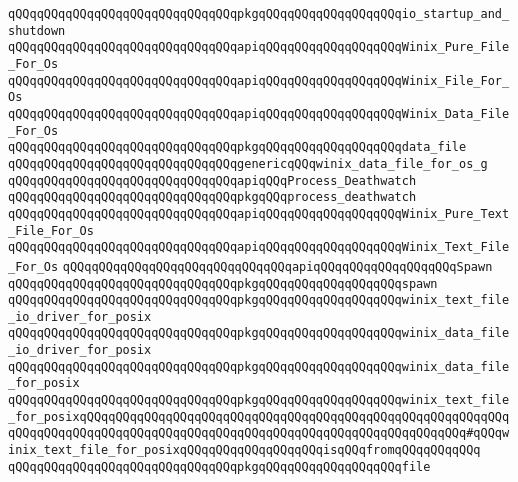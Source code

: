 \verb|qQQqqQQqqQQqqQQqqQQqqQQqqQQqqQQqpkgqQQqqQQqqQQqqQQqqQQqio_startup_and_shutdown|\newline
\newline
\verb|qQQqqQQqqQQqqQQqqQQqqQQqqQQqqQQqapiqQQqqQQqqQQqqQQqqQQqWinix_Pure_File_For_Os|\newline
\verb|qQQqqQQqqQQqqQQqqQQqqQQqqQQqqQQqapiqQQqqQQqqQQqqQQqqQQqWinix_File_For_Os|\newline
\verb|qQQqqQQqqQQqqQQqqQQqqQQqqQQqqQQqapiqQQqqQQqqQQqqQQqqQQqWinix_Data_File_For_Os|\newline
\verb|qQQqqQQqqQQqqQQqqQQqqQQqqQQqqQQqpkgqQQqqQQqqQQqqQQqqQQqdata_file|\newline
\verb|qQQqqQQqqQQqqQQqqQQqqQQqqQQqqQQqgenericqQQqwinix_data_file_for_os_g|\newline
\newline
\verb|qQQqqQQqqQQqqQQqqQQqqQQqqQQqqQQqapiqQQqProcess_Deathwatch|\newline
\verb|qQQqqQQqqQQqqQQqqQQqqQQqqQQqqQQqpkgqQQqprocess_deathwatch|\newline
\newline
\verb|qQQqqQQqqQQqqQQqqQQqqQQqqQQqqQQqapiqQQqqQQqqQQqqQQqqQQqWinix_Pure_Text_File_For_Os|\newline
\verb|qQQqqQQqqQQqqQQqqQQqqQQqqQQqqQQqapiqQQqqQQqqQQqqQQqqQQqWinix_Text_File_For_Os|\newline
\verb|qQQqqQQqqQQqqQQqqQQqqQQqqQQqqQQqapiqQQqqQQqqQQqqQQqqQQqSpawn|\newline
\verb|qQQqqQQqqQQqqQQqqQQqqQQqqQQqqQQqpkgqQQqqQQqqQQqqQQqqQQqspawn|\newline
\verb|qQQqqQQqqQQqqQQqqQQqqQQqqQQqqQQqpkgqQQqqQQqqQQqqQQqqQQqwinix_text_file_io_driver_for_posix|\newline
\verb|qQQqqQQqqQQqqQQqqQQqqQQqqQQqqQQqpkgqQQqqQQqqQQqqQQqqQQqwinix_data_file_io_driver_for_posix|\newline
\newline
\verb|qQQqqQQqqQQqqQQqqQQqqQQqqQQqqQQqpkgqQQqqQQqqQQqqQQqqQQqwinix_data_file_for_posix|\newline
\verb|qQQqqQQqqQQqqQQqqQQqqQQqqQQqqQQqpkgqQQqqQQqqQQqqQQqqQQqwinix_text_file_for_posixqQQqqQQqqQQqqQQqqQQqqQQqqQQqqQQqqQQqqQQqqQQqqQQqqQQqqQQqqQQqqQQqqQQqqQQqqQQqqQQqqQQqqQQqqQQqqQQqqQQqqQQqqQQqqQQqqQQqqQQqqQQq#qQQqwinix_text_file_for_posixqQQqqQQqqQQqqQQqqQQqisqQQqfromqQQqqQQqqQQq|\newline
\verb|qQQqqQQqqQQqqQQqqQQqqQQqqQQqqQQqpkgqQQqqQQqqQQqqQQqqQQqfile|\newline
